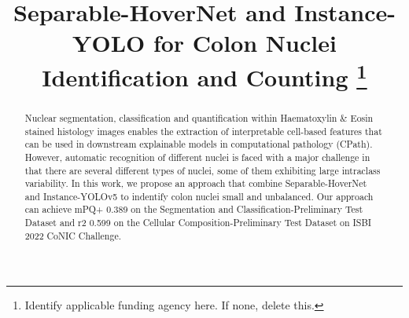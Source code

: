 \documentclass[conference]{IEEEtran}
\begin{document}
\title{Separable-HoverNet and Instance-YOLO for Colon Nuclei Identification and Counting
\thanks{Identify applicable funding agency here. If none, delete this.}
}

\author{
\and
{}
\and
{}
\and
{}
\and
{}
}

\maketitle

\begin{abstract}
Nuclear segmentation, classification and quantification within Haematoxylin \& Eosin stained histology images enables the extraction of interpretable cell-based features that can be used in downstream explainable models in computational pathology (CPath). However, automatic recognition of different nuclei is faced with a major challenge in that there are several different types of nuclei, some of them exhibiting large intraclass variability. In this work, we propose an approach that combine Separable-HoverNet and Instance-YOLOv5 to indentify colon nuclei small and unbalanced. Our approach can achieve mPQ+ 0.389 on the Segmentation and Classification-Preliminary Test Dataset and r2 0.599 on the Cellular Composition-Preliminary Test Dataset on ISBI 2022 CoNIC Challenge\cite{b1}.
\end{abstract}
\end{document}
